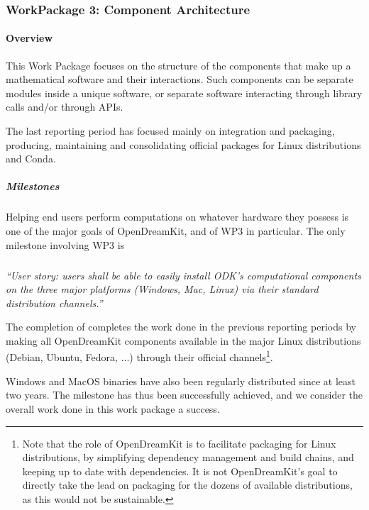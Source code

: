 \subsubsection{WorkPackage 3:  Component Architecture}

\paragraph{Overview}

This Work Package focuses on the structure of the components that make
up a mathematical software and their interactions. Such components can
be separate modules inside a unique software, or separate software
interacting through library calls and/or through APIs.

The last reporting period has focused mainly on integration and
packaging, producing, maintaining and consolidating official packages
for Linux distributions and Conda.

\subparagraph{Milestones} Helping end users perform computations on
whatever hardware they possess is one of the major goals of
OpenDreamKit, and of WP3 in particular. The only milestone involving
WP3 is

\subparagraph{}

\emph{“User story: users shall be able to easily install ODK's
    computational components on the three major platforms (Windows,
    Mac, Linux) via their standard distribution channels.”}

  The completion of
   completes
  the work done in the previous reporting periods by making all
  OpenDreamKit components available in the major Linux distributions
  (Debian, Ubuntu, Fedora, ...) through their official
  channels\footnote{Note that the role of OpenDreamKit is to
    facilitate packaging for Linux distributions, by simplifying
    dependency management and build chains, and keeping up to date
    with dependencies. It is not OpenDreamKit's goal to directly take
    the lead on packaging for the dozens of available distributions,
    as this would not be sustainable.}.

  Windows and MacOS binaries have also been regularly distributed
  since at least two years. The milestone has thus been successfully
  achieved, and we consider the overall work done in this work package
  a success.
  
